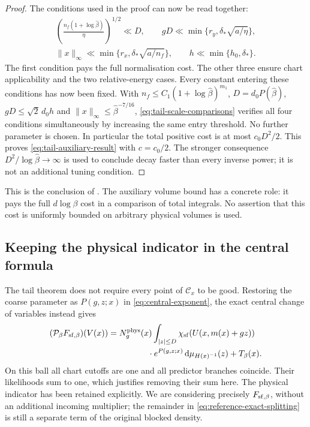 \documentclass[11pt,reqno]{amsart}
\numberwithin{equation}{section}
\theoremstyle{definition}
\theoremstyle{remark}
\newcommand{\dd}{\mathrm d}
\begin{document}
\begin{proof}
The conditions used in the proof can now be read together:
\[
 \begin{gathered}
 \left(\frac{n_f(1+\log\widehat\beta)}{\eta}\right)^{1/2}
              \ll D,\qquad
 gD\ll\min\{r_y,\delta_*\sqrt{a/\eta}\},\\
 \|x\|_\infty\ll
           \min\{r_x,\delta_*\sqrt{a/n_f}\},\qquad
 h\ll\min\{h_0,\delta_*\}.
 \end{gathered}
\]
The first condition pays the full normalisation cost.
The other three ensure chart applicability and the two
relative-energy cases. Every constant entering these
conditions has now been fixed. With
\(n_f\le C_1(1+\log\widehat\beta)^{m_1}\),
\(D=d_0P(\widehat\beta)\), \(gD\le\sqrt2\,d_0h\) and
\(\|x\|_\infty\le\widehat\beta^{-7/16}\),
\eqref{eq:tail-scale-comparisons} verifies all four
conditions simultaneously by increasing the same entry
threshold. No further parameter is chosen.
In particular the total positive cost is at most
\(c_0D^2/2\). This proves
\eqref{eq:tail-auxiliary-result} with \(c=c_0/2\).
The stronger consequence
\(D^2/\log\widehat\beta\to\infty\) is used to conclude
decay faster than every inverse power; it is not an
additional tuning condition.
\end{proof}

This is the conclusion of
\cite[Theorem~15.4 and (15.7), pp.~76--77]{Main}.
The auxiliary volume bound has a concrete role: it pays
the full \(d\log\beta\) cost in a comparison of total
integrals. No assertion that this cost is uniformly
bounded on arbitrary physical volumes is used.

\subsection{Keeping the physical indicator in the central formula}

The tail theorem does not require every point of
\(\mathcal C_x\) to be good. Restoring the coarse parameter
as \(P(g,z;x)\) in \eqref{eq:central-exponent}, the exact
central change of variables instead gives
\begin{equation}
 \begin{split}
       (\mathcal P_\beta F_{{\rm sf},\beta})(V(x))
       ={}&N_g^{\mathrm{phys}}(x)\int_{|z|\le D}
             \chi_{\rm sf}(U(x,m(x)+gz))\\
          &\hspace{12mm}\cdot e^{P(g,z;x)}
                           \,\dd\mu_{H(x)^{-1}}(z)
                     +T_\beta(x).
 \end{split}
 \label{eq:tail-exact-masked-central}
\end{equation}
On this ball all chart cutoffs are one and all predictor
branches coincide. Their likelihoods sum to one, which
justifies removing their sum here. The physical indicator
has been retained explicitly. We are considering precisely
\(F_{{\rm sf},\beta}\), without an additional incoming
multiplier; the remainder in
\eqref{eq:reference-exact-splitting} is still a separate
term of the original blocked density.
\end{document}
